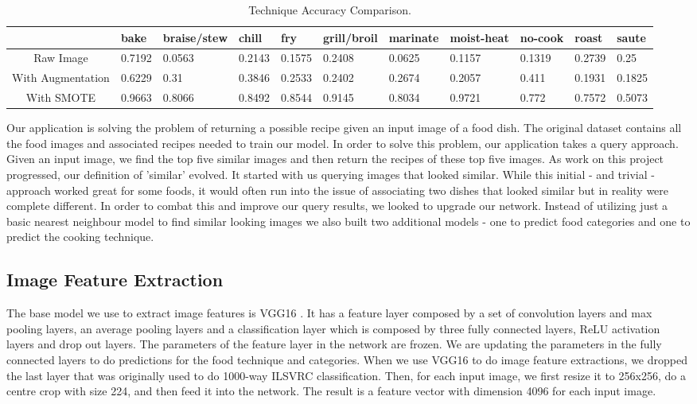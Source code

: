 \documentclass[10pt,twocolumn,letterpaper]{article}
\begin{document}
\begin{table}
\begin{center}
\begin{tabular}{|c|l|l|l|l|l|l|l|l|l|l|}
\hline
 & bake & braise/stew & chill & fry & grill/broil & marinate & moist-heat & no-cook & roast & saute \\
\hline\hline
Raw Image & 0.7192 & 0.0563 & 0.2143 & 0.1575 & 0.2408 & 0.0625 & 0.1157 & 0.1319 & 0.2739 & 0.25 \\
With Augmentation & 0.6229 & 0.31 & 0.3846 & 0.2533 & 0.2402 & 0.2674 & 0.2057 & 0.411 & 0.1931 & 0.1825 \\
With SMOTE & 0.9663 & 0.8066 & 0.8492 & 0.8544 & 0.9145 & 0.8034 & 0.9721 & 0.772 & 0.7572 & 0.5073 \\
\hline
\end{tabular}
\end{center}
\caption{Technique Accuracy Comparison.}
\label{tab:accuracy}
\end{table}
Our application is solving the problem of returning a possible recipe given an input image of a food dish. The original dataset contains all the food images and associated recipes needed to train our model. In order to solve this problem, our application takes a query approach. Given an input image, we find the top five similar images and then return the recipes of these top five images. As work on this project progressed, our definition of 'similar' evolved. It started with us querying images that looked similar. While this initial - and trivial - approach worked great for some foods, it would often run into the issue of associating two dishes that looked similar but in reality were complete different. In order to combat this and improve our query results, we looked to upgrade our network. Instead of utilizing just a basic nearest neighbour model to find similar looking images we also built two additional models - one to predict food categories and one to predict the cooking technique.
\subsection{Image Feature Extraction}
The base model we use to extract image features is VGG16 \cite{Authors01}. It has a feature layer composed by a set of convolution layers and max pooling layers, an average pooling layers and a classification layer which is composed by three fully connected layers, ReLU activation layers and drop out layers. 
The parameters of the feature layer in the network are frozen. We are updating the parameters in the fully connected layers to do predictions for the food technique and categories. When we use VGG16 to do image feature extractions, we dropped the last layer that was originally used to do 1000-way ILSVRC classification. Then, for each input image, we first resize it to 256x256, do a centre crop with size 224, and then feed it into the network. The result is a feature vector with dimension 4096 for each input image.
\end{document}
